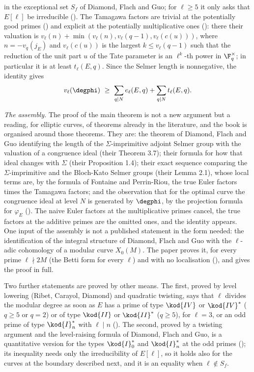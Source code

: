 in the exceptional set $S_f$ of Diamond, Flach and Guo; for $\ell\ge5$ it only asks that $E[\ell]$
be irreducible (). The Tamagawa factors are trivial at the potentially good primes
() and explicit at the potentially multiplicative ones
(): there their valuation is
$v_\ell(n)+\min(v_\ell(n),v_\ell(q-1),v_\ell(c(u)))$, where $n=-v_q(j_E)$ and $v_\ell(c(u))$ is
the largest $k\le v_\ell(q-1)$ such that the reduction of the unit part $u$ of the Tate parameter
is an $\ell^k$-th power in $\F_q^\times$; in particular it is at least $t_\ell(E,q)$. Since the Selmer length is
nonnegative, the identity gives
\[
v_\ell(\degphi)\ \ge\ \sum_{q\mid N}e_\ell(E,q)+\sum_{q\mid N}t_\ell(E,q).
\]

\emph{The assembly.} The proof of the main theorem is not a new argument but a reading, for
elliptic curves, of theorems already in the literature, and the book is organised around those
theorems. They are: the theorem of Diamond, Flach and Guo identifying the length of the
$\Sigma$-imprimitive adjoint Selmer group with the valuation of a congruence ideal (their Theorem
3.7); their formula for how that ideal changes with $\Sigma$ (their Proposition 1.4); their exact
sequence comparing the $\Sigma$-imprimitive and the Bloch-Kato Selmer groups (their Lemma 2.1),
whose local terms are, by the formula of Fontaine and Perrin-Riou, the true Euler factors times the
Tamagawa factors; and the observation that for the optimal curve the congruence ideal at level $N$
is generated by $\degphi$, by the projection formula for $\varphi_E$
(). The naive Euler factors at the multiplicative primes
cancel, the true factors at the additive primes are the omitted ones, and the identity appears.
One input of the assembly is not a published statement in the form needed: the identification
of the integral structure of Diamond, Flach and Guo with the $\ell$-adic cohomology of a modular
curve $X_0(M)$. The paper proves it, for every prime $\ell\nmid2M$ (the Betti form for every $\ell$) and with no localisation
(), and  gives the proof in full.

Two further statements are proved by other means. The first, proved by level lowering (Ribet,
Carayol, Diamond) and quadratic twisting, says that $\ell$ divides the modular degree as soon as
$E$ has a prime of type $\kod{IV}$ or $\kod{IV}^*$ ($q\ge5$ or $q=2$) or of type $\kod{II}$ or
$\kod{II}^*$ ($q\ge5$), for $\ell=3$, or an odd prime of type $\kod{I}_n^*$ with $\ell\mid n$
(). The second, proved by a twisting argument and the level-raising
formula of Diamond, Flach and Guo, is a quantitative version for the types $\kod{I}_0^*$ and
$\kod{I}_n^*$ at the odd primes (); its inequality needs only the
irreducibility of $E[\ell]$, so it holds also for the curves at the boundary described next, and it
is an equality when $\ell\notin S_f$.


